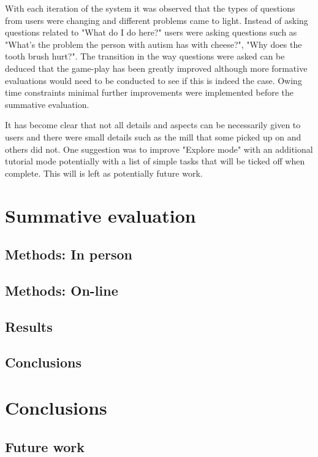 \documentclass[11pt]{report}
\begin{document}
With each iteration of the system it was observed that the types of questions from users were changing and different problems came to light. Instead of asking questions related to "What do I do here?" users were asking questions such as "What's the problem the person with autism has with cheese?", "Why does the tooth brush hurt?". The transition in the way questions were asked can be deduced that the game-play has been greatly improved although more formative evaluations would need to be conducted to see if this is indeed the case. Owing time constraints minimal further improvements were implemented before the summative evaluation. 

It has become clear that not all details and aspects can be necessarily given to users and there were small details such as the mill that some picked up on and others did not. One suggestion was to improve "Explore mode" with an additional tutorial mode potentially with a list of simple tasks that will be ticked off when complete. This will is left as potentially future work.


\chapter{Summative evaluation}


\section{Methods: In person}


\section{Methods: On-line}

\section{Results}

\section{Conclusions}

\chapter{Conclusions}




\section{Future work}
\end{document}
